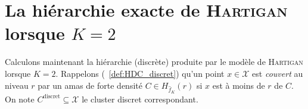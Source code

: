 \section{La hiérarchie exacte de \textsc{Hartigan} lorsque $K=2$}

Calculons maintenant la hiérarchie (discrète) produite par le modèle de \textsc{Hartigan} lorsque $K=2$.
Rappelons (\Def~\ref{def:HDC_discret}) qu'un point $x\in\mathcal X$ est \emph{couvert} au niveau $r$ par un amas de forte densité $ C \in H_{\widehat f_K}(r)$ si $x $ est à moins de $r$ de $C$. On note $C^{\mathrm{discret}} \subseteq \mathcal X$ le cluster discret correspondant.





\begin{figure}[htbp]
    \centering
    
    \begin{subfigure}[b]{0.45\textwidth}
        \centering
\end{subfigure}
\end{figure}
